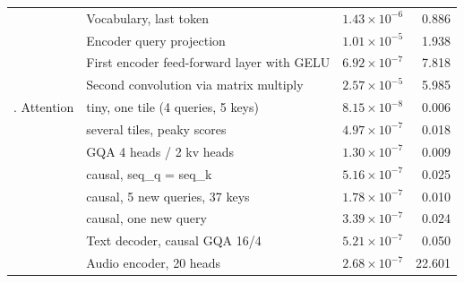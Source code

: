 \begin{center}
\begin{tabular}{@{}llrr@{}}
 & Vocabulary, last token & \(1.43\times 10^{-6}\) & 0.886 \\
 & Encoder query projection & \(1.01\times 10^{-5}\) & 1.938 \\
 & First encoder feed-forward layer with GELU & \(6.92\times 10^{-7}\) & 7.818 \\
 & Second convolution via matrix multiply & \(2.57\times 10^{-5}\) & 5.985 \\
\addlinespace
4. Attention & tiny, one tile (4 queries, 5 keys) & \(8.15\times 10^{-8}\) & 0.006 \\
 & several tiles, peaky scores & \(4.97\times 10^{-7}\) & 0.018 \\
 & GQA 4 heads / 2 kv heads & \(1.30\times 10^{-7}\) & 0.009 \\
 & causal, seq\_q = seq\_k & \(5.16\times 10^{-7}\) & 0.025 \\
 & causal, 5 new queries, 37 keys & \(1.78\times 10^{-7}\) & 0.010 \\
 & causal, one new query & \(3.39\times 10^{-7}\) & 0.024 \\
 & Text decoder, causal GQA 16/4 & \(5.21\times 10^{-7}\) & 0.050 \\
 & Audio encoder, 20 heads & \(2.68\times 10^{-7}\) & 22.601 \\
\bottomrule
\end{tabular}
\end{center}
